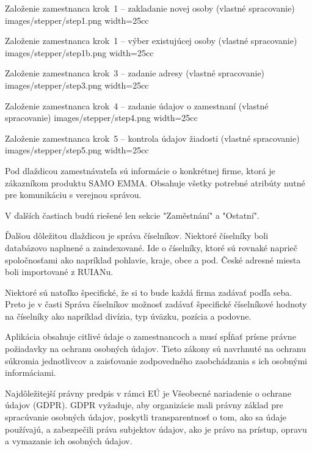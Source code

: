 {Založenie zamestnanca krok~1 -- zakladanie novej osoby (vlastné spracovanie)}
{images/stepper/step1.png}
{width=25cc} 

{Založenie zamestnanca krok~1 -- výber existujúcej osoby (vlastné spracovanie)}
{images/stepper/step1b.png}
{width=25cc} 

{Založenie zamestnanca krok~3 -- zadanie adresy (vlastné spracovanie)}
{images/stepper/step3.png}
{width=25cc} 

{Založenie zamestnanca krok~4 -- zadanie údajov o zamestnaní (vlastné spracovanie)}
{images/stepper/step4.png}
{width=25cc} 

{Založenie zamestnanca krok~5 -- kontrola údajov žiadosti (vlastné spracovanie)}
{images/stepper/step5.png}
{width=25cc} 


Pod dlaždicou zamestnávateľa sú informácie o konkrétnej firme, ktorá je zákazníkom produktu SAMO EMMA. Obsahuje všetky potrebné atribúty nutné pre komunikáciu s verejnou správou.

V ďalších častiach budú riešené len sekcie "Zaměstnání" a "Ostatní". 

Ďalšou dôležitou dlaždicou je správa číselníkov. Niektoré číselníky boli databázovo naplnené a zaindexované. Ide o číselníky, ktoré sú rovnaké naprieč spoločnosťami ako napríklad pohlavie, kraje, obce a pod. České adresné miesta boli importované z RUIANu.

Niektoré sú natoľko špecifické, že si to bude každá firma zadávať podľa seba. Preto je v časti Správa číselníkov možnosť zadávať špecifické číselníkové hodnoty na číselníky ako napríklad divízia, typ úväzku, pozícia a podovne.


Aplikácia obsahuje citlivé údaje o zamestnancoch a musí spĺňať prísne právne požiadavky na ochranu osobných údajov. Tieto zákony sú navrhnuté na ochranu súkromia jednotlivcov a zaisťovanie zodpovedného zaobchádzania s ich osobnými informáciami.

Najdôležitejší právny predpis v rámci EÚ je Všeobecné nariadenie o ochrane údajov (GDPR). GDPR vyžaduje, aby organizácie mali právny základ pre spracúvanie osobných údajov, poskytli transparentnosť o tom, ako sa údaje používajú, a zabezpečili práva subjektov údajov, ako je právo na prístup, opravu a vymazanie ich osobných údajov.

